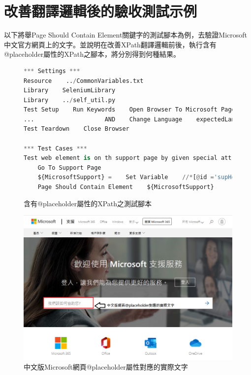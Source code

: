 \section{改善翻譯邏輯後的驗收測試示例}
以下將舉Page Should Contain Element關鍵字的測試腳本為例，去驗證Microsoft中文官方網頁上的文字。並說明在改善XPath翻譯邏輯前後，執行含有@placeholder屬性的XPath之腳本，將分別得到何種結果。

\begin{figure}[H]
\begin{lstlisting}[language={python}]
*** Settings ***
Resource    ../CommonVariables.txt
Library    SeleniumLibrary
Library    ../self_util.py
Test Setup    Run Keywords    Open Browser To Microsoft Page
...                    AND    Change Language    expectedLanguage=${language}
Test Teardown    Close Browser

*** Test Cases ***
Test web element is on th support page by given special attributes
    Go To Support Page
    ${MicrosoftSupport} =    Set Variable    //*[@id ='supHomeAndLandingPageSearchBox' and @placeholder ='How can we help you?']
    Page Should Contain Element    ${MicrosoftSupport}
\end{lstlisting}
\caption{含有@placeholder屬性的XPath之測試腳本}
\end{figure}

\begin{figure}[H]
\centering
\includegraphics[width= .9\textwidth]{../論文截圖/4-2-2 畫面上@placeholder的實際文字.png}
\caption{中文版Microsoft網頁@placeholder屬性對應的實際文字}
\end{figure}

